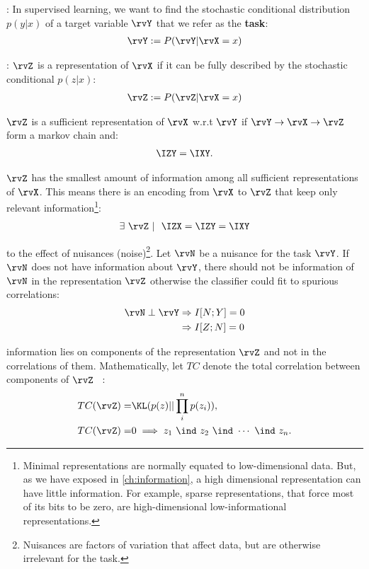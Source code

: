 \begin{description}[wide=0\parindent]%
    \item [task]: In supervised learning, we want to find the stochastic conditional distribution \textbf{$p(y|x)$} of a target variable $\rvY$ that we refer as the \textbf{task}:
    \begin{align*}
        \rvY := P(\rvY|\rvX=x)
    \end{align*}
    \item [representation]: $\rvZ$ is a representation of $\rvX$ if it can be fully described by the stochastic conditional $p(z|x)$:
    \begin{align*}
        \rvZ := P(\rvZ|\rvX=x)
    \end{align*}
  \item[sufficient:] $\rvZ$ is a sufficient representation of $\rvX$ w.r.t $\rvY$ if $\rvY \to \rvX \to \rvZ$ form a markov chain and:
    \begin{align*}
        \IZY=\IXY.
    \end{align*}
    \item[minimal:] $\rvZ$ has the smallest amount of information among all sufficient representations of $\rvX$.  This means there is an encoding from $\rvX$ to $\rvZ$ that keep only relevant information\footnote{Minimal representations are normally equated to low-dimensional data. But, as we have exposed in \cref{ch:information}, a high dimensional representation can have little information. For example, sparse representations, that force most of its bits to be zero, are high-dimensional low-informational representations.}:
  \begin{align}
      \exists ~\rvZ~ | ~~ \IZX = \IZY = \IXY
  \end{align}
  \item[invariant:]
to the effect of nuisances (noise)\footnote{Nuisances are factors of variation that affect data, but are otherwise irrelevant for the task.}. Let $\rvN$ be a nuisance for the task $\rvY$. If $\rvN$ does not have information about $\rvY$, there should not be information of $\rvN$ in the representation $\rvZ$ otherwise the classifier could fit to spurious correlations:\begin{align}
    \rvN\perp \rvY &\Rightarrow I[N;Y]=0 \nonumber\\
    &\Rightarrow I[Z;N]=0
  \end{align}
  \item[maximally disentangled:] information lies on components of the representation $\rvZ$ and not in the correlations of them. Mathematically, let $TC$ denote the total correlation between components of $\rvZ$~\cite{achille:2017emergence} :
  \begin{align}
    TC(\rvZ)=& \KL(p(z)||\prod_i^n p(z_i)),\\
    TC(\rvZ)=& 0 \implies z_1 ~\ind~ z_2 ~\ind~ \cdots ~\ind~ z_n.
  \end{align}
\end{description}

